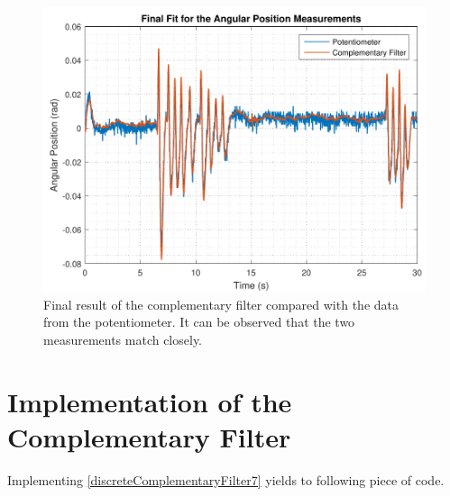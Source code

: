 %
\begin{figure}[H]
	\centering
	\includegraphics[scale=0.65]{figures/filterSensTool}
	\caption{Final result of the complementary filter compared with the data from the potentiometer. It can be observed that the two measurements match closely.}
	\label{filterSensTool}
\end{figure}\vspace{-5mm}
%

\section{Implementation of the Complementary Filter}
Implementing \eqref{discreteComplementaryFilter7} yields to following piece of code. 

